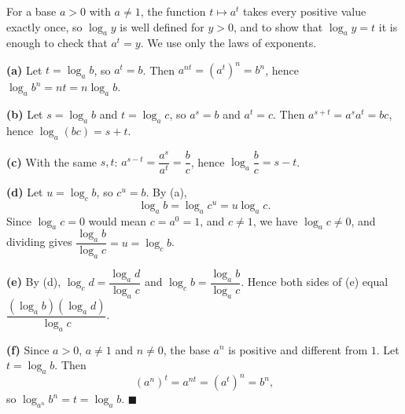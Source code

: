 For a base $a>0$ with $a\ne1$, the function $t\mapsto a^t$ takes every positive value exactly once, so $\log_a y$ is well defined for $y>0$, and to show that $\log_a y=t$ it is enough to check that $a^t=y$. We use only the laws of exponents.

\textbf{(a)} Let $t=\log_a b$, so $a^t=b$. Then $a^{nt}=\left(a^t\right)^n=b^n$, hence $\log_a b^n=nt=n\log_a b$.

\textbf{(b)} Let $s=\log_a b$ and $t=\log_a c$, so $a^s=b$ and $a^t=c$. Then $a^{s+t}=a^sa^t=bc$, hence $\log_a(bc)=s+t$.

\textbf{(c)} With the same $s,t$: $a^{s-t}=\dfrac{a^s}{a^t}=\dfrac{b}{c}$, hence $\log_a\dfrac {b}{c}=s-t$.

\textbf{(d)} Let $u=\log_c b$, so $c^u=b$. By (a),
\[\log_a b=\log_a c^u=u\log_a c .\]
Since $\log_a c=0$ would mean $c=a^0=1$, and $c\ne1$, we have $\log_a c\ne0$, and dividing gives $\dfrac{\log_a b}{\log_a c}=u=\log_c b$.

\textbf{(e)} By (d), $\log_c d=\dfrac{\log_a d}{\log_a c}$ and $\log_c b=\dfrac{\log_a b}{\log_a c}$. Hence both sides of (e) equal $\dfrac{\left(\log_a b\right)\left(\log_a d\right)}{\log_a c}$.

\textbf{(f)} Since $a>0$, $a\ne1$ and $n\ne0$, the base $a^n$ is positive and different from $1$. Let $t=\log_a b$. Then
\[\left(a^n\right)^t=a^{nt}=\left(a^t\right)^n=b^n,\]
so $\log_{a^n}b^n=t=\log_a b$. $\blacksquare$
